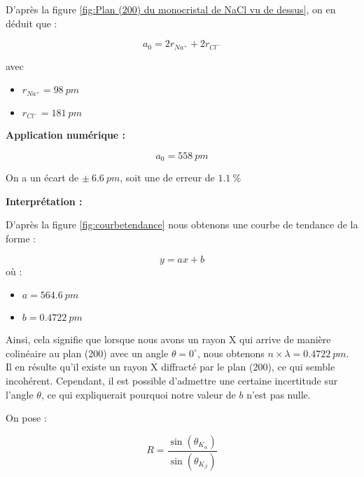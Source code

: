	
	
	D'après la figure \ref{fig:Plan (200) du monocristal de NaCl vu de dessus}, on en déduit que :
	
	\begin{equation}
		a_0 = 2r_{Na^+}+2r_{Cl^-}
	\end{equation}

avec 
\begin{itemize}
	\item $r_{Na^+}= 98 \ pm$
	\item $r_{Cl^-}= 181 \ pm $	
\end{itemize}


\vspace{0.2cm}

\begin{flushleft}
	\textbf{Application numérique :}
\end{flushleft}

	
	\begin{equation}
		a_0 = 558 \ pm
	\end{equation}
	
On a un écart de $ \pm \ 6.6\  pm$,  soit une de erreur de $1.1 \ \%$
\begin{flushleft}
	\textbf{Interprétation :}
\end{flushleft}


D'après la figure \ref{fig:courbetendance} nous obtenons une courbe de tendance de la forme :

\begin{equation}
	y=a x + b
\end{equation}
où :
\begin{itemize}
	\item $a =564.6 \ pm$ 
	\item $b = 0.4722 \ pm$
\end{itemize}
\vspace{0.2cm}
Ainsi, cela signifie que lorsque nous avons un rayon X qui arrive de manière colinéaire au plan (200) avec un angle $\theta = 0^\circ$, nous obtenons $n \times \lambda = 0.4722 \ pm$. Il en résulte qu'il existe un rayon X diffracté par le plan (200), ce qui semble incohérent. Cependant, il est possible d'admettre une certaine incertitude sur l'angle $\theta$, ce qui expliquerait pourquoi notre valeur de $b$ n'est pas nulle.



On pose :

\begin{equation}
	R = \frac{\sin(\theta_{K_{\alpha}})}{\sin(\theta_{K_{\beta}})}
\end{equation}


